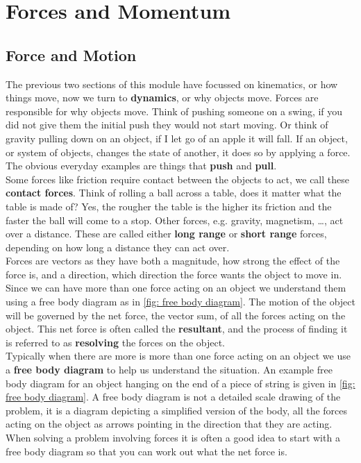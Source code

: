 \chapter{Forces and Momentum}
\section{Force and Motion}
The previous two sections of this module have focussed on kinematics, or how things move, now we turn to \textbf{dynamics}, or why objects move.  Forces are responsible for why objects move. Think of pushing someone on a swing, if you did not give them the initial push they would not start moving. Or think of gravity pulling down on an object, if I let go of an apple it will fall. If an object, or system of objects, changes the state of another, it does so by applying a force. The obvious everyday examples are things that \textbf{push} and \textbf{pull}. \\

Some forces like friction require contact between the objects to act, we call these \textbf{contact forces}. Think of rolling a ball across a table, does it matter what the table is made of? Yes, the rougher the table is the higher its friction and the faster the ball will come to a stop. Other forces, e.g. gravity, magnetism, \dots{}, act over a distance. These are called either \textbf{long range} or \textbf{short range} forces, depending on how long a distance they can act over. \\

Forces are vectors as they have both a magnitude, how strong the effect of the force is, and a direction, which direction the force wants the object to move in.  Since we can have more than one force acting on an object we understand them using a free body diagram as in \cref{fig: free body diagram}. The motion of the object will be governed by the net force, the vector sum, of all the forces acting on the object. This net force is often called the \textbf{resultant}, and the process of finding it is referred to as \textbf{resolving} the forces on the object.\\

Typically when there are more is more than one force acting on an object we use a \textbf{free body diagram} to help us understand the situation. An example free body diagram for an object hanging on the end of a piece of string is given in \cref{fig: free body diagram}.  A free body diagram is not a detailed scale drawing of the problem, it is a diagram depicting a simplified version of the body, all the forces acting on the object as arrows pointing in the direction that they are acting. When solving a problem involving forces it is often a good idea to start with a free body diagram so that you can work out what the net force is.

